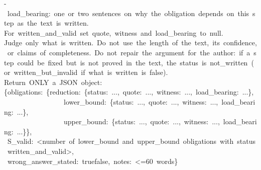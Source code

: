 \begin{flushleft}
{}-{}\ \textquotedbl{}load\_bearing\textquotedbl{}:\ one\ or\ two\ sentences\ on\ why\ the\ obligation\ depends\ on\ this\ step\ as\ the\ text\ is\ written.\\
{}For\ \textquotedbl{}written\_and\_valid\textquotedbl{}\ set\ quote,\ witness\ and\ load\_bearing\ to\ null.\\
{}Judge\ only\ what\ is\ written.\ Do\ not\ use\ the\ length\ of\ the\ text,\ its\ confidence,\ or\ claims\ of\ completeness.\ Do\ not\ repair\ the\ argument\ for\ the\ author:\ if\ a\ step\ could\ be\ fixed\ but\ is\ not\ proved\ in\ the\ text,\ the\ status\ is\ not\_written\ (or\ written\_but\_invalid\ if\ what\ is\ written\ is\ false).\\
{}Return\ ONLY\ a\ JSON\ object:\\
{}\{\textquotedbl{}obligations\textquotedbl{}:\ \{\textquotedbl{}reduction\textquotedbl{}:\ \{\textquotedbl{}status\textquotedbl{}:\ \textquotedbl{}...\textquotedbl{},\ \textquotedbl{}quote\textquotedbl{}:\ ...,\ \textquotedbl{}witness\textquotedbl{}:\ ...,\ \textquotedbl{}load\_bearing\textquotedbl{}:\ ...\},\\
{}\ \ \ \ \ \ \ \ \ \ \ \ \ \ \ \ \ \textquotedbl{}lower\_bound\textquotedbl{}:\ \{\textquotedbl{}status\textquotedbl{}:\ \textquotedbl{}...\textquotedbl{},\ \textquotedbl{}quote\textquotedbl{}:\ ...,\ \textquotedbl{}witness\textquotedbl{}:\ ...,\ \textquotedbl{}load\_bearing\textquotedbl{}:\ ...\},\\
{}\ \ \ \ \ \ \ \ \ \ \ \ \ \ \ \ \ \textquotedbl{}upper\_bound\textquotedbl{}:\ \{\textquotedbl{}status\textquotedbl{}:\ \textquotedbl{}...\textquotedbl{},\ \textquotedbl{}quote\textquotedbl{}:\ ...,\ \textquotedbl{}witness\textquotedbl{}:\ ...,\ \textquotedbl{}load\_bearing\textquotedbl{}:\ ...\}\},\\
{}\ \textquotedbl{}S\_valid\textquotedbl{}:\ \textless{}number\ of\ lower\_bound\ and\ upper\_bound\ obligations\ with\ status\ written\_and\_valid\textgreater{},\\
{}\ \textquotedbl{}wrong\_answer\_stated\textquotedbl{}:\ true\textbar{}false,\ \textquotedbl{}notes\textquotedbl{}:\ \textquotedbl{}\textless{}=60\ words\textquotedbl{}\}\\
\end{flushleft}
